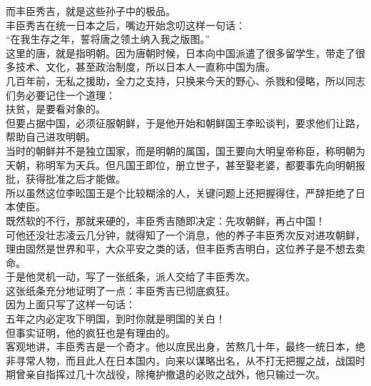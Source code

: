 \begin{multicols}{\theparacolNo}
而丰臣秀吉，就是这些孙子中的极品。\\

丰臣秀吉在统一日本之后，嘴边开始念叨这样一句话：\\

“在我生存之年，誓将唐之领土纳入我之版图。”\\

这里的唐，就是指明朝。因为唐朝时候，日本向中国派遣了很多留学生，带走了很多技术、文化，甚至政治制度，所以日本人一直称中国为唐。\\

几百年前，无私之援助，全力之支持，只换来今天的野心、杀戮和侵略，所以同志们务必要记住一个道理：\\

扶贫，是要看对象的。\\

但要占据中国，必须征服朝鲜，于是他开始和朝鲜国王李昖谈判，要求他们让路，帮助自己进攻明朝。\\

当时的朝鲜并不是独立国家，而是明朝的属国，国王要向大明皇帝称臣，称明朝为天朝，称明军为天兵。但凡国王即位，册立世子，甚至娶老婆，都要事先向明朝报批，获得批准之后才能做。\\

所以虽然这位李昖国王是个比较糊涂的人，关键问题上还把握得住，严辞拒绝了日本使臣。\\

既然软的不行，那就来硬的，丰臣秀吉随即决定：先攻朝鲜，再占中国！\\

可他还没壮志凌云几分钟，就得知了一个消息，他的养子丰臣秀次反对进攻朝鲜，理由固然是世界和平，大众平安之类的话，但丰臣秀吉明白，这位养子是不想去卖命。\\

于是他灵机一动，写了一张纸条，派人交给了丰臣秀次。\\

这张纸条充分地证明了一点：丰臣秀吉已彻底疯狂。\\

因为上面只写了这样一句话：\\

五年之内必定攻下明国，到时你就是明国的关白！\\

但事实证明，他的疯狂也是有理由的。\\

客观地讲，丰臣秀吉是一个奇才。他以庶民出身，苦熬几十年，最终一统日本，绝非寻常人物，而且此人在日本国内，向来以谋略出名，从不打无把握之战，战国时期曾亲自指挥过几十次战役，除掩护撤退的必败之战外，他只输过一次。\\


\end{multicols}
